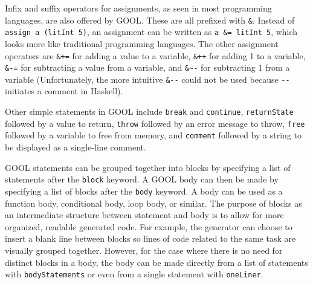 \documentclass[sigplan,review,anonymous,prologue,dvipsnames]{acmart}
\begin{document}
Infix and suffix operators for assignments, as seen in most programming 
languages, are also offered by GOOL. These are all prefixed with \verb|&|. 
Instead of \verb|assign a (litInt 5)|, an assignment can be written as 
\verb|a &= litInt 5|, which looks more like traditional programming languages. 
The other assignment operators are \verb|&+=| for adding a value to a variable, 
\verb|&++| for adding 1 to a variable, \verb|&-=| for subtracting a value 
from a variable, and \verb|&~-| for subtracting 1 from a variable 
(Unfortunately, the more intuitive \verb|&--| could not be used because 
\verb|--| initiates a comment in Haskell).

Other simple statements in GOOL include \verb|break| and \verb|continue|, 
\verb|returnState| followed by a value to return, \verb|throw| followed by an 
error message to throw, \verb|free| followed by a variable to free from
memory, and \verb|comment| followed by a string to be displayed as a 
single-line comment.

GOOL statements can be grouped together into blocks by specifying a list of 
statements after the \verb|block| keyword. A GOOL body can then be made by 
specifying a list of blocks after the \verb|body| keyword. A body can be used 
as a function body, conditional body, loop body, or similar. The purpose of 
blocks as an intermediate structure between statement and body is to allow for 
more organized, readable generated code. For example, the generator can choose 
to insert a blank line between blocks so lines of code related to the same task 
are visually grouped together. However, for the case where there is no need for 
distinct blocks in a body, the body can be made directly from a list of 
statements with \verb|bodyStatements| or even from a single statement with 
\verb|oneLiner|. 
 
\end{document}
